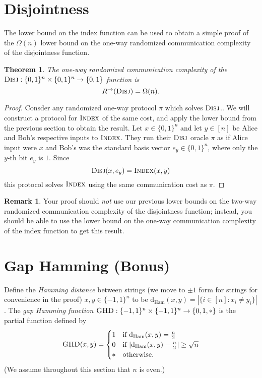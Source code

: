 \documentclass[11pt]{amsart}
\theoremstyle{plain}
\newtheorem{theorem}{Theorem}
\theoremstyle{definition}
\newtheorem{remark}{Remark}
\theoremstyle{plain}
\newcommand{\dHam}{\mathrm{d}_{\mathrm{Ham}}}
\newcommand{\Disj}{\textsc{Disj}}
\newcommand{\GHD}{\textsc{GHD}}
\newcommand{\Index}{\textsc{Index}}
\begin{document}
\newpage 
\section{Disjointness}

The lower bound on the index function can be used to obtain a simple proof of the $\Omega(n)$ lower bound on the one-way randomized communication complexity of the disjointness function.

\begin{theorem}
The one-way randomized communication complexity of the $\Disj : \{0,1\}^n \times \{0,1\}^n \to \{0,1\}$ function is
\[
R^\rightarrow(\Disj) = \Omega(n).
\]
\end{theorem}

\begin{proof}
Consder any randomized one-way protocol $\pi$ which solves $\Disj$.. We will construct a protocol for $\Index$ of the same cost, and apply the lower bound from the previous section to obtain the result. Let $x \in \{0,1\}^n$ and let $y \in [n]$ be Alice and Bob's respective inputs to $\Index$. They run their $\Disj$ oracle $\pi$ as if Alice input were $x$ and Bob's was the standard basis vector $e_y\in\{0,1\}^n$, where only the $y$-th bit $e_y$ is $1$. Since
$$\Disj(x,e_y) = \Index(x,y)$$ 
this protocol solves $\Index$ using the same communication cost as $\pi$.
\end{proof}

\begin{remark}
Your proof should \emph{not} use our previous lower bounds on the two-way randomized communication complexity of the disjointness function; instead, you should be able to use the lower bound on the one-way communication complexity of the index function to get this result.
\end{remark}



\newpage 
\section{Gap Hamming (Bonus)}

Define the \emph{Hamming distance} between strings (we move to $\pm 1$ form for strings for convenience in the proof) $x,y \in \{-1,1\}^n$ to be $\dHam(x,y) = |\{i \in [n] : x_i \neq y_i\}|$.
The \emph{gap Hamming function} $\GHD : \{-1,1\}^n \times \{-1,1\}^n \to \{0,1,*\}$ is the partial function defined by
\[
\GHD(x,y) = \begin{cases}
1 & \mbox{if } \dHam(x,y) = \frac n2 \\
0 & \mbox{if } |\dHam(x,y) - \frac n2| \ge \sqrt{n} \\
* & \mbox{otherwise.}
\end{cases}
\] 
(We assume throughout this section that $n$ is even.)
\end{document}
